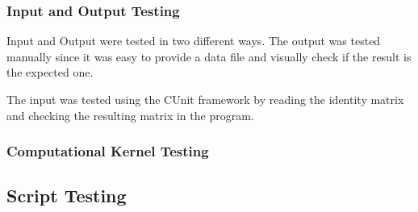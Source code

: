 \documentclass[12pt,a4paper]{article}
\begin{document}



\subsubsection{Input and Output Testing}

Input and Output were tested in two different ways. The output was tested manually since it was easy to provide a data file and visually check if the result is the expected one. 

The input was tested using the CUnit framework by reading the identity matrix and checking the resulting matrix in the program. 



\subsubsection{Computational Kernel Testing}





\subsection{Script Testing}
\end{document}
